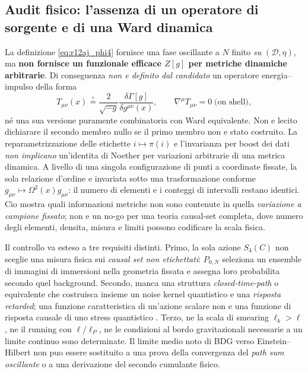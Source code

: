 \documentclass[11pt,a4paper]{article}
\begin{document}
\subsection{Audit fisico: l'assenza di un operatore di sorgente e di una Ward dinamica}

La definizione \eqref{eq:r12aj_phi4} fornisce una fase oscillante a $N$ finito \emph{su} $(\mathcal D,\eta)$, ma \textbf{non fornisce un funzionale efficace $Z[g]$ per metriche dinamiche arbitrarie}. Di conseguenza \emph{non e definito dal candidato} un operatore energia--impulso della forma
\begin{equation}
 T_{\mu\nu}(x)\stackrel{?}{=}\frac{2}{\sqrt{-g}}\frac{\delta\Gamma[g]}{\delta g^{\mu\nu}(x)},
 \qquad\nabla^\mu T_{\mu\nu}=0\;\text{(on shell)},
 \label{eq:r12aj_missing_stress}
\end{equation}
né una sua versione puramente combinatoria con Ward equivalente. Non e lecito dichiarare il secondo membro nullo se il primo membro non e stato costruito. La reparametrizzazione delle etichette $i\mapsto\pi(i)$ e l'invarianza per boost dei dati \emph{non implicano} un'identita di Noether per variazioni arbitrarie di una metrica dinamica. A livello di una singola configurazione di punti a coordinate fissate, la sola relazione d'ordine e invariata sotto una trasformazione conforme $g_{\mu\nu}\mapsto\Omega^2(x)g_{\mu\nu}$: il numero di elementi e i conteggi di intervalli restano identici. Cio mostra quali informazioni metriche non sono contenute in quella \emph{variazione a campione fissato}; non e un no-go per una teoria causal-set completa, dove numero degli elementi, densita, misura e limiti possono codificare la scala fisica.

Il controllo va esteso a tre requisiti distinti. Primo, la sola azione $S_4(C)$ non sceglie una misura fisica sui \emph{causal set non etichettati}: $P_{0,N}$ seleziona un ensemble di immagini di immersioni nella geometria fissata e assegna loro probabilita secondo quel background. Secondo, manca una struttura \emph{closed-time-path} o equivalente che costruisca insieme un noise kernel quantistico e una \emph{risposta retarded}; una funzione caratteristica di un'azione scalare non e una funzione di risposta causale di uno stress quantistico \cite{HuVerdaguer2008}. Terzo, ne la scala di smearing $\ell_k>\ell$, ne il running con $\ell/\ell_P$, ne le condizioni al bordo gravitazionali necessarie a un limite continuo sono determinate. Il limite medio noto di BDG verso Einstein--Hilbert \cite{BenincasaDowker2010,Surya2019Review,MachetWang2021} non puo essere sostituito a una prova della convergenza del \emph{path sum oscillante} o a una derivazione del secondo cumulante fisico.
\end{document}
